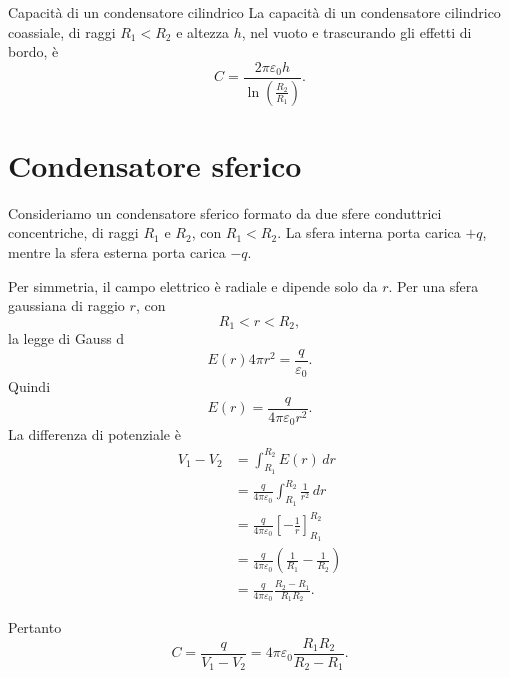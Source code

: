 \documentclass[a4paper]{article}
\begin{document}
\begin{snippettheorem}{Capacità di un condensatore cilindrico}
    La capacità di un condensatore cilindrico coassiale, di raggi \(R_1<R_2\) e altezza \(h\), nel vuoto e trascurando gli effetti di bordo, è
    \[
        C=\frac{2\pi\varepsilon_0h}{\ln\left(\frac{R_2}{R_1}\right)}.
    \]
\end{snippettheorem}

\section{Condensatore sferico}

Consideriamo un condensatore sferico formato da due sfere conduttrici concentriche, di raggi \(R_1\) e \(R_2\), con \(R_1<R_2\). La sfera interna porta carica \(+q\), mentre la sfera esterna porta carica \(-q\).

\begin{center}
\end{center}

Per simmetria, il campo elettrico è radiale e dipende solo da \(r\). Per una sfera gaussiana di raggio \(r\), con
\[
    R_1<r<R_2,
\]
la legge di Gauss d
\[
    E(r)4\pi r^2=\frac{q}{\varepsilon_0}.
\]
Quindi
\[
    E(r)=\frac{q}{4\pi\varepsilon_0r^2}.
\]
La differenza di potenziale è
\begin{align*}
    V_1-V_2
    &=\int_{R_1}^{R_2}E(r)\,dr \\
    &=\frac{q}{4\pi\varepsilon_0}\int_{R_1}^{R_2}\frac{1}{r^2}\,dr \\
    &=\frac{q}{4\pi\varepsilon_0}\left[-\frac{1}{r}\right]_{R_1}^{R_2} \\
    &=\frac{q}{4\pi\varepsilon_0}\left(\frac{1}{R_1}-\frac{1}{R_2}\right) \\
    &=\frac{q}{4\pi\varepsilon_0}\frac{R_2-R_1}{R_1R_2}.
\end{align*}

Pertanto
\[
    C=\frac{q}{V_1-V_2}
    =4\pi\varepsilon_0\frac{R_1R_2}{R_2-R_1}.
\]
\end{document}
